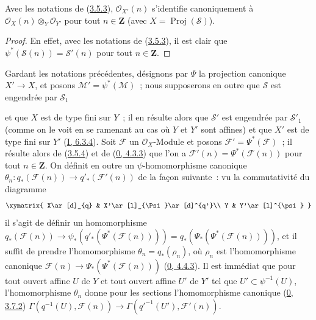 \begin{corollary}[3.5.4]
\label{II.3.5.4-fr}
Avec les notations de (\hyperref[II.3.5.3-fr]{3.5.3}),
$\mathcal{O}_{X'}(n)$ s'identifie canoniquement à
$\mathcal{O}_X(n)\otimes_Y\mathcal{O}_{Y'}$ pour tout $n\in\mathbf{Z}$ (avec
$X=\operatorname{Proj}(\mathcal{S})$).
\end{corollary}

\begin{proof}
En effet, avec les notations de (\hyperref[II.3.5.3-fr]{3.5.3}), il est clair
que $\psi^*(\mathcal{S}(n))=\mathcal{S}'(n)$ pour tout $n\in\mathbf{Z}$.
\end{proof}

\begin{env}[3.5.5]
\label{II.3.5.5-fr}
Gardant les notations précédentes, désignons par $\Psi$ la projection
canonique $X'\to X$, et posons $\mathcal{M}'=\psi^*(\mathcal{M})$~; nous
supposerons en outre que $\mathcal{S}$ est engendrée par $\mathcal{S}_1$


et que $X$ est de type fini sur $Y$~; il en résulte alors que $\mathcal{S}'$
est engendrée par $\mathcal{S}'_1$ (comme on le voit en se ramenant au cas où
$Y$ et $Y'$ sont affines) et que $X'$ est de type fini sur $Y'$
(\hyperref[I.6.3.4-fr]{I, 6.3.4}). Soit $\mathcal{F}$ un
$\mathcal{O}_X$-Module et posons $\mathcal{F}'=\Psi^*(\mathcal{F})$~; il
résulte alors de (\hyperref[II.3.5.4-fr]{3.5.4}) et de
(\hyperref[0.4.3.3-fr]{0, 4.3.3}) que l'on a
$\mathcal{F}'(n)=\Psi^*(\mathcal{F}(n))$ pour tout $n\in\mathbf{Z}$. On
définit en outre un $\psi$-homomorphisme canonique
$\theta_n:q_*(\mathcal{F}(n))\to q'_*(\mathcal{F}'(n))$ de la façon
suivante~: vu la commutativité du diagramme
\[
  \xymatrix{
    X\ar[d]_{q}
    & X'\ar[l]_{\Psi}\ar[d]^{q'}\\
    Y
    & Y'\ar[l]^{\psi}
  }
\]
il s'agit de définir un homomorphisme
$q_*(\mathcal{F}(n))\to
\psi_*(q'_*(\Psi^*(\mathcal{F}(n))))
=q_*(\Psi_*(\Psi^*(\mathcal{F}(n))))$, et il suffit de prendre
l'homomorphisme $\theta_n=q_*(\rho_n)$, où $\rho_n$ est l'homomorphisme
canonique
$\mathcal{F}(n)\to\Psi_*(\Psi^*(\mathcal{F}(n)))$
(\hyperref[0.4.4.3-fr]{0, 4.4.3}). Il est immédiat que pour tout ouvert affine
$U$ de $Y$ et tout ouvert affine $U'$ de $Y'$ tel que
$U'\subset\psi^{-1}(U)$, l'homomorphisme $\theta_n$ donne pour les sections
l'homomorphisme canonique (\hyperref[0.3.7.2-fr]{0, 3.7.2})
$\Gamma(q^{-1}(U),\mathcal{F}(n))\to
\Gamma(q'^{-1}(U'),\mathcal{F}'(n))$.


\end{env}

